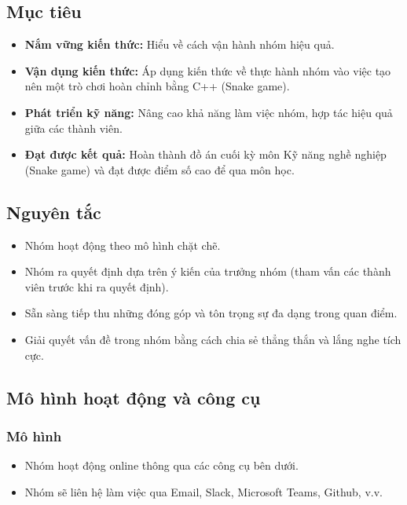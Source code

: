 \documentclass[a4paper,12pt]{article}
\begin{document}
\subsection{Mục tiêu}
\begin{itemize}
    \item \textbf{Nắm vững kiến thức:} Hiểu về cách vận hành nhóm hiệu quả.
    \item \textbf{Vận dụng kiến thức:} Áp dụng kiến thức về thực hành nhóm vào việc tạo nên một trò chơi hoàn chỉnh bằng C++ (Snake game).
    \item \textbf{Phát triển kỹ năng:} Nâng cao khả năng làm việc nhóm, hợp tác hiệu quả giữa các thành viên.
    \item \textbf{Đạt được kết quả:} Hoàn thành đồ án cuối kỳ môn Kỹ năng nghề nghiệp (Snake game) và đạt được điểm số cao để qua môn học.
\end{itemize}

\subsection{Nguyên tắc}
\begin{itemize}
    \item Nhóm hoạt động theo mô hình chặt chẽ.
    \item Nhóm ra quyết định dựa trên ý kiến của trưởng nhóm (tham vấn các thành viên trước khi ra quyết định).
    \item Sẵn sàng tiếp thu những đóng góp và tôn trọng sự đa dạng trong quan điểm.
    \item Giải quyết vấn đề trong nhóm bằng cách chia sẻ thẳng thắn và lắng nghe tích cực.
\end{itemize}

\subsection{Mô hình hoạt động và công cụ}

\subsubsection{Mô hình}
\begin{itemize}
    \item Nhóm hoạt động online thông qua các công cụ bên dưới.
    \item Nhóm sẽ liên hệ làm việc qua Email, Slack, Microsoft Teams, Github, v.v.
\end{itemize}

\end{document}

